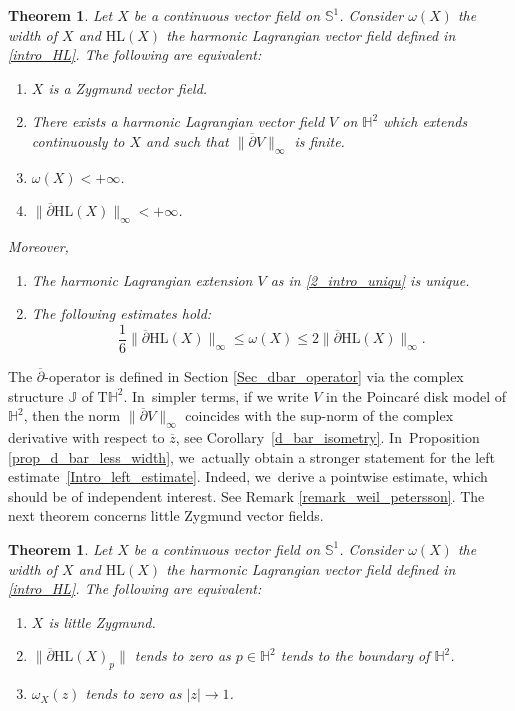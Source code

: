 \documentclass[10pt]{amsart}
\newenvironment{enumeratei}
{\bgroup\def\theenumi{\roman{enumi}}\def\theenumii{\arabic{enumii}}\begin{enumerate}}
{\end{enumerate}\egroup}
\theoremstyle{plain}
\newtheorem{theorem}[cor]{Theorem}
\theoremstyle{definition}
\begin{document}
\begin{theorem}\label{intro_uniqu_HL}
Let $X$ be a continuous vector field on $\mathbb{S}^1$. Consider $\omega(X)$ the width of $X$ and $\mathrm{HL}(X)$ the harmonic Lagrangian vector field defined in \eqref{intro_HL}. The following are equivalent:
\begin{enumerate}
\item \label{1_intro_uniqu} $X$ is a Zygmund vector field.
\item \label{2_intro_uniqu} There exists a harmonic Lagrangian vector field $V$ on $\mathbb{H}^2$ which extends continuously to $X$ and such that $\lVert\overline{\partial} V \rVert_{\infty}$ is finite.
\item \label{3_intro_uniqu} $\omega(X)<+\infty$.
\item \label{4_intro_uniqu} $\lVert \overline{\partial}\mathrm{HL}(X)\rVert_{\infty}<+\infty$.
\end{enumerate}
Moreover,
\begin{enumeratei}
\item\label{Moreover_i} The harmonic Lagrangian extension $V$ as in \eqref{2_intro_uniqu} is unique.
\item\label{Moreover_ii} The following estimates hold:
\begin{equation}\label{Intro_left_estimate}
\frac{1}{6}\lVert \overline{\partial} \mathrm{HL}(X)\rVert_{\infty} \leq \omega(X) \leq 2\lVert \overline{\partial} \mathrm{HL}(X) \rVert_{\infty}.
\end{equation}
\end{enumeratei}
\end{theorem}

The \(\overline{\partial}\)-operator is defined in Section \ref{Sec_dbar_operator} via the complex structure \(\mathbb{J}\) of \(\mathrm{T}\mathbb{H}^2\). In~simpler terms, if we write \(V\) in the Poincaré disk model of \(\mathbb{H}^2\), then the norm \(\lVert\overline{\partial} V \rVert_{\infty}\) coincides with the sup-norm of the complex derivative with respect to \(\overline{z}\), see Corollary~\ref{d_bar_isometry}. In~Proposition \ref{prop_d_bar_less_width}, we~actually obtain a stronger statement for the left estimate~\eqref{Intro_left_estimate}. Indeed, we~derive a pointwise estimate, which should be of independent interest. See Remark \ref{remark_weil_petersson}. The next theorem concerns little Zygmund vector fields.

\begin{theorem}\label{Intro_chara_little}
Let $X$ be a continuous vector field on $\mathbb{S}^1$. Consider $\omega(X)$ the width of $X$ and $\mathrm{HL}(X)$ the harmonic Lagrangian vector field defined in \eqref{intro_HL}. The following are equivalent:
\begin{enumerate}
\item $X$ is little Zygmund.
\item $\lVert \overline{\partial} \mathrm{HL}(X)_p\rVert$ tends to zero as $p \in \mathbb{H}^2$ tends to the boundary of $\mathbb{H}^2$.
\item $\omega_X(z)$ tends to zero as $\lvert z \rvert \to 1$.
\end{enumerate}
\end{theorem}
\end{document}
